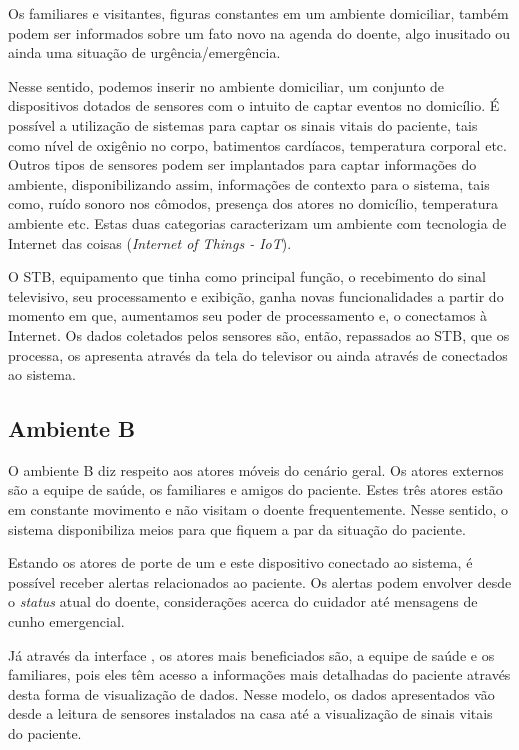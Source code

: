 Os familiares e visitantes, figuras constantes em um ambiente domiciliar, também
podem ser informados sobre um fato novo na agenda do doente, algo inusitado ou 
ainda uma situação de urgência/emergência.

Nesse sentido, podemos inserir no ambiente domiciliar, um conjunto de
dispositivos dotados de sensores com o intuito de captar eventos no domicílio. É
possível a utilização de sistemas para captar os sinais vitais do paciente, tais
como nível de oxigênio no corpo, batimentos cardíacos, temperatura corporal etc.
Outros tipos de sensores podem ser implantados para captar informações do
ambiente, disponibilizando assim, informações de contexto para o sistema,  tais
como, ruído sonoro nos cômodos, presença dos atores no domicílio, temperatura
ambiente etc. Estas duas categorias caracterizam um  ambiente com tecnologia de
Internet das coisas (\textit{Internet of Things  - IoT}).

O STB, equipamento que tinha como principal função, o recebimento do sinal
televisivo, seu processamento e  exibição, ganha novas funcionalidades a partir
do momento em que, aumentamos seu  poder de processamento e, o conectamos à 
Internet. Os dados coletados pelos sensores são, então, repassados ao STB,
que os processa, os apresenta através da tela do televisor ou ainda através de
\smartphones[] conectados ao sistema.

\subsection{Ambiente B} \label{subsec:ambiente-b}

O ambiente B diz respeito aos atores móveis do cenário geral. Os atores externos
são a equipe de saúde, os familiares e amigos do paciente. Estes três atores
estão em constante movimento e não visitam o doente frequentemente. Nesse
sentido, o sistema disponibiliza meios para que fiquem a par da situação do
paciente.

Estando os atores de porte de um \smartphone[] e este dispositivo conectado ao
sistema, é possível receber alertas relacionados ao paciente. Os alertas podem
envolver desde o \textit{status} atual do doente, considerações acerca do
cuidador até mensagens de cunho emergencial.

Já através da interface \web[], os atores mais beneficiados são, a equipe de
saúde e os familiares, pois eles têm acesso a informações mais detalhadas do
paciente através desta forma de visualização de dados. Nesse modelo, os dados
apresentados vão desde a leitura de sensores instalados na casa até a
visualização de sinais vitais do paciente.


